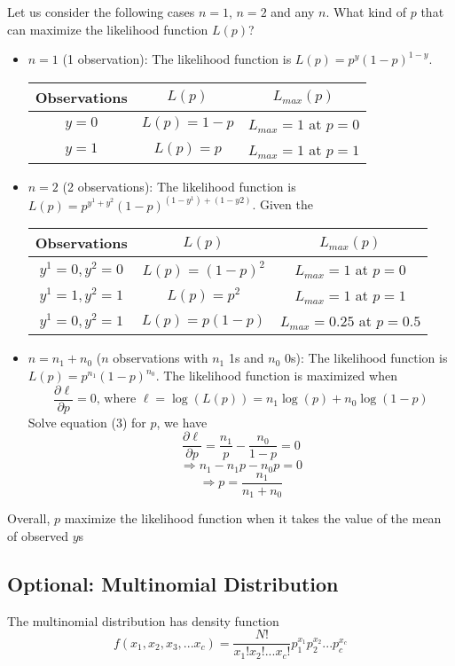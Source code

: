 \documentclass[12pt, oneside]{article}
\begin{document}
Let us consider the following cases $n=1$, $n=2$ and any $n$. What kind of $p$ that can maximize the likelihood function $L(p)$?
\begin{itemize}
\item $n=1$ (1 observation): The likelihood function is $L(p)=p^{y}(1-p)^{1-y}$. 
\begin{center}
\begin{tabular}{c|c|c} 
Observations & $L(p)$ &$ L_{max}(p)$\\
\hline
$y=0$ & $L(p)=1-p$ &$L_{max}=1$ at $p=0$\\
$y=1$ & $L(p)=p$     &$L_{max}=1$ at $p=1$\\
\end{tabular}
\end{center}
\item $n=2$ (2 observations): The likelihood function is $L(p)=p^{y^1+y^2}(1-p)^{(1-y^1)+(1-y2)}$. Given the 
\begin{center}
\begin{tabular}{c|c|c} 
Observations & $L(p)$ &$ L_{max}(p)$\\
\hline
$y^1=0, y^2=0$ & $L(p)=(1-p)^2$ &$L_{max}=1$ at $p=0$\\
$y^1=1, y^2=1$ & $L(p)=p^2$     &$L_{max}=1$ at $p=1$\\
$y^1=0, y^2=1$ & $L(p)=p(1-p)$  &$L_{max}=0.25$ at $p=0.5$
\end{tabular}
\end{center}
\item $n=n_1+n_0$ ($n$ observations with $n_1$ 1s and $n_0$ 0s): The likelihood function is $L(p)=p^{n_1}(1-p)^{n_0}$. The likelihood function is maximized when 
\begin{equation}
\frac{\partial \ell}{\partial p}=0 \text{, where }\ell=\log(L(p))=n_1 \log(p)+n_0 \log(1-p)
\end{equation}
Solve equation (3) for $p$, we have 
$$\frac{\partial \ell}{\partial p}=\frac{n_1}{p}-\frac{n_0}{1-p}=0$$
$$\Rightarrow n_1-n_1 p-n_0 p=0$$
$$\Rightarrow p=\frac{n_1}{n_1+n_0}$$
\end{itemize}

Overall, $p$ maximize the likelihood function when it takes the value of the mean of observed $y$s
\subsection{Optional: Multinomial Distribution}

The multinomial distribution has density function
$${f(x_1, x_2, x_3, ... x_c)=\frac{N!}{x_1! x_2! ... x_c!} p_1^{x_1} p_2^{x_2} ... p_c^{x_c}}$$
\end{document}

